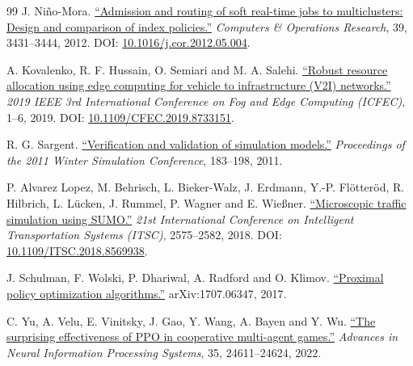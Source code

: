 \documentclass[12pt,a4paper]{article}
\begin{document}
\begin{thebibliography}{99}
 J. Niño-Mora. \href{\detokenize{https://arxiv.org/abs/2207.12815}}{``Admission and routing of soft real-time jobs to multiclusters: Design and comparison of index policies.''} \emph{Computers \& Operations Research}, 39, 3431--3444, 2012. DOI: \href{\detokenize{https://doi.org/10.1016/j.cor.2012.05.004}}{10.1016/j.cor.2012.05.004}.

 A. Kovalenko, R. F. Hussain, O. Semiari and M. A. Salehi. \href{\detokenize{https://arxiv.org/abs/1905.04458v1}}{``Robust resource allocation using edge computing for vehicle to infrastructure (V2I) networks.''} \emph{2019 IEEE 3rd International Conference on Fog and Edge Computing (ICFEC)}, 1--6, 2019. DOI: \href{\detokenize{https://doi.org/10.1109/CFEC.2019.8733151}}{10.1109/CFEC.2019.8733151}.

 R. G. Sargent. \href{\detokenize{https://www.informs-sim.org/wsc11papers/016.pdf}}{``Verification and validation of simulation models.''} \emph{Proceedings of the 2011 Winter Simulation Conference}, 183--198, 2011.

 P. Alvarez Lopez, M. Behrisch, L. Bieker-Walz, J. Erdmann, Y.-P. Flötteröd, R. Hilbrich, L. Lücken, J. Rummel, P. Wagner and E. Wießner. \href{\detokenize{https://elib.dlr.de/127994/}}{``Microscopic traffic simulation using SUMO.''} \emph{21st International Conference on Intelligent Transportation Systems (ITSC)}, 2575--2582, 2018. DOI: \href{\detokenize{https://doi.org/10.1109/ITSC.2018.8569938}}{10.1109/ITSC.2018.8569938}.

 J. Schulman, F. Wolski, P. Dhariwal, A. Radford and O. Klimov. \href{\detokenize{https://arxiv.org/abs/1707.06347}}{``Proximal policy optimization algorithms.''} arXiv:1707.06347, 2017.

 C. Yu, A. Velu, E. Vinitsky, J. Gao, Y. Wang, A. Bayen and Y. Wu. \href{\detokenize{https://papers.nips.cc/paper/2022/file/9c1535a02f0ce079433344e14d910597-Paper-Datasets_and_Benchmarks.pdf}}{``The surprising effectiveness of PPO in cooperative multi-agent games.''} \emph{Advances in Neural Information Processing Systems}, 35, 24611--24624, 2022.


\end{thebibliography}
\end{document}
